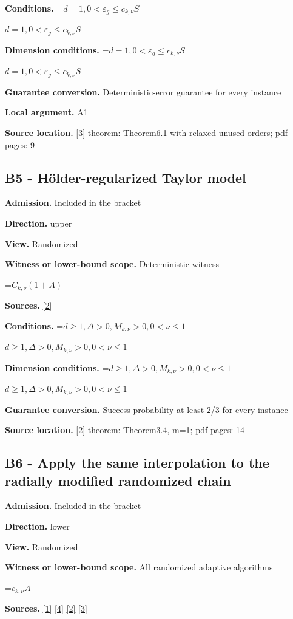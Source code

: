 \documentclass[10pt,a4paper]{article}
\newcommand{\AtlasMath}[1]{\par\begingroup\centering\setbox0=\hbox{$\displaystyle #1$}\ifdim\wd0>1.4\linewidth\typeout{ATLAS WIDE FORMULA: \the\wd0}\fi\ifdim\wd0>\linewidth\resizebox{\linewidth}{!}{\box0}\else\box0\fi\par\endgroup}
\newcommand{\AtlasInlineMath}[1]{\begingroup\setbox0=\hbox{$#1$}\ifdim\wd0>.4\linewidth\endgroup\AtlasMath{#1}\else\endgroup$#1$\fi}
\begin{document}
\textbf{Conditions.} \AtlasInlineMath{d=1,0<\varepsilon_g\le c_{k,\nu}S}

\textbf{Dimension conditions.} \AtlasInlineMath{d=1,0<\varepsilon_g\le c_{k,\nu}S}

\textbf{Guarantee conversion.} Deterministic-error guarantee for every instance

\textbf{Local argument.} A1

\textbf{Source location.} \href{https://arxiv.org/abs/2610.16295}{[3]} theorem: Theorem6.1 with relaxed unused orders; pdf pages: 9

\subsection{B5 - Hölder-regularized Taylor model}
\textbf{Admission.} Included in the bracket

\textbf{Direction.} upper

\textbf{View.} Randomized

\textbf{Witness or lower-bound scope.} Deterministic witness

\AtlasMath{C_{k,\nu}(1+A)}
\textbf{Sources.} \href{https://arxiv.org/abs/1811.01220}{[2]}

\textbf{Conditions.} \AtlasInlineMath{d\ge 1,\Delta>0,M_{k,\nu}>0,0<\nu\le 1}

\textbf{Dimension conditions.} \AtlasInlineMath{d\ge 1,\Delta>0,M_{k,\nu}>0,0<\nu\le 1}

\textbf{Guarantee conversion.} Success probability at least 2/3 for every instance

\textbf{Source location.} \href{https://arxiv.org/abs/1811.01220}{[2]} theorem: Theorem3.4, m=1; pdf pages: 14

\subsection{B6 - Apply the same interpolation to the radially modified randomized chain}
\textbf{Admission.} Included in the bracket

\textbf{Direction.} lower

\textbf{View.} Randomized

\textbf{Witness or lower-bound scope.} All randomized adaptive algorithms

\AtlasMath{c_{k,\nu} A}
\textbf{Sources.} \href{https://arxiv.org/abs/1710.11606}{[1]} \href{https://arxiv.org/abs/1710.11606v3}{[4]} \href{https://arxiv.org/abs/1811.01220}{[2]} \href{https://arxiv.org/abs/2610.16295}{[3]}
\end{document}
